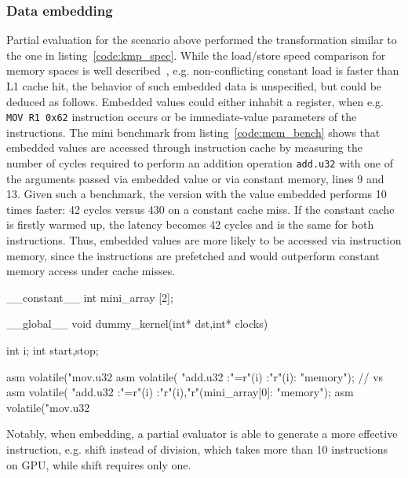 \subsubsection{Data embedding}\label{data_embedding}
Partial evaluation for the scenario above performed the transformation 
similar to the one in listing~\ref{code:kmp_spec}. While the load/store 
speed comparison for memory spaces is well described~\cite{TeslaT4Bench}, 
e.g. non-conflicting constant load is faster than L1 cache hit, the behavior 
of such embedded data is unspecified, but could be deduced as follows.
Embedded values could either inhabit a register, when e.g. \texttt{MOV R1 0x62}
 instruction occurs or be immediate-value parameters of the instructions. 
  The mini benchmark from listing~\ref{code:mem_bench} shows that embedded values are accessed through instruction cache by measuring the
   number of cycles required to perform an addition operation
   \texttt{add.u32} with one of the arguments passed via embedded value or 
   via constant memory, lines 9 and 13. Given such a benchmark, the version with the value 
   embedded performs 10 times faster: 42 cycles versus 430 on a constant cache miss. If the constant 
   cache is firstly warmed up, the latency becomes 42 cycles and is the same for both instructions. 
   Thus, embedded values are more likely to be accessed via instruction memory, since 
   the instructions are prefetched and would outperform constant memory access under cache misses. 
   
   \begin{listing}
    \begin{pyglist}[language=C, caption=Memory benchmark,label=code:mem_bench]
__constant__ int mini_array [2];
    
__global__ void dummy_kernel(int* dst,int* clocks){
        
    int i;
    int start,stop;
        
    asm volatile("mov.u32 %
    asm volatile(
                "add.u32 %
                :"=r"(i) :"r"(i): "memory");
    // vs
    asm volatile(
                "add.u32 %
                :"=r"(i) :"r"(i),"r"(mini_array[0]: "memory");
    asm volatile("mov.u32 %
    }
    \end{pyglist}
    \end{listing}

   Notably, when embedding, a partial evaluator is able to generate a more effective instruction, e.g. 
   shift instead of division, which takes more than 10 instructions on GPU, 
   while shift requires only one.

